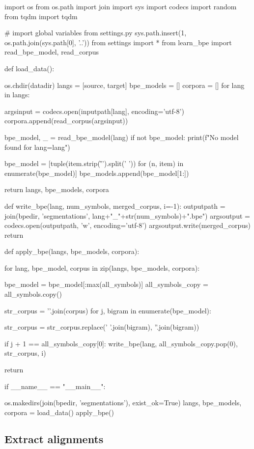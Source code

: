 \begin{python}
import os
from os.path import join
import sys
import codecs
import random
from tqdm import tqdm

# import global variables from settings.py
sys.path.insert(1, os.path.join(sys.path[0], '..'))
from settings import *
from learn_bpe import read_bpe_model, read_corpus

def load_data():

  os.chdir(datadir)
  langs = [source, target]
  bpe_models = []
  corpora = []
  for lang in langs:

    argsinput = codecs.open(inputpath[lang], encoding='utf-8')
    corpora.append(read_corpus(argsinput))

    bpe_model, _ = read_bpe_model(lang)
    if not bpe_model:
      print(f"No model found for lang={lang}")

    bpe_model = [tuple(item.strip('\r\n ').split(' ')) for (n, item) in enumerate(bpe_model)]
    bpe_models.append(bpe_model[1:])

  return langs, bpe_models, corpora


def write_bpe(lang, num_symbols, merged_corpus, i=-1):
  outputpath = join(bpedir, 'segmentations', lang+"_"+str(num_symbols)+".bpe")
  argsoutput = codecs.open(outputpath, 'w', encoding='utf-8')
  argsoutput.write(merged_corpus)
  return


def apply_bpe(langs, bpe_models, corpora):
    
  for lang, bpe_model, corpus in zip(langs, bpe_models, corpora):

    bpe_model = bpe_model[:max(all_symbols)]
    all_symbols_copy = all_symbols.copy()

    str_corpus = '\n'.join(corpus)
    for j, bigram in enumerate(bpe_model):

      str_corpus = str_corpus.replace(' '.join(bigram), ''.join(bigram))

      if j + 1 == all_symbols_copy[0]:
        write_bpe(lang, all_symbols_copy.pop(0), str_corpus, i)

  return


if __name__ == "__main__":

  os.makedirs(join(bpedir, 'segmentations'), exist_ok=True)
  langs, bpe_models, corpora = load_data()
  apply_bpe()
\end{python}

\subsection{Extract alignments}

